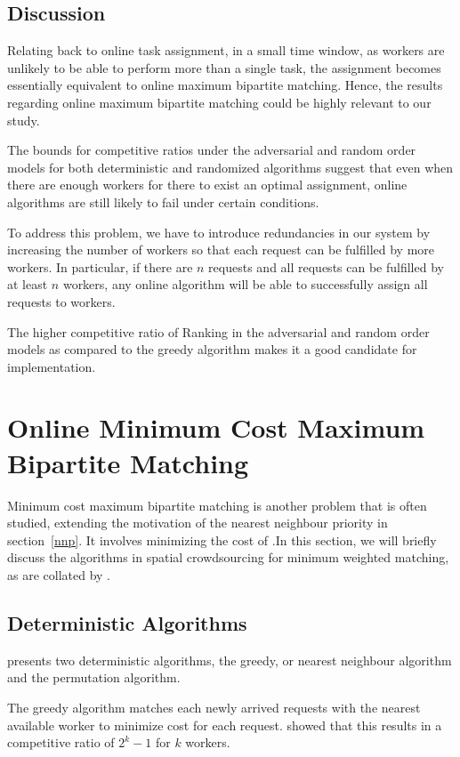 \documentclass[urop]{socreport}
\begin{document}
\subsection{Discussion}
Relating back to online task assignment, in a small time window, as workers are unlikely to be able to perform more than a single task, the assignment becomes essentially equivalent to online maximum bipartite matching. Hence, the results regarding online maximum bipartite matching could be highly relevant to our study.  

The bounds for competitive ratios under the adversarial and random order models for both deterministic and randomized algorithms suggest that even when there are enough workers for there to exist an optimal assignment, online algorithms are still likely to fail under certain conditions. 

To address this problem, we have to introduce redundancies in our system by increasing the number of workers so that each request can be fulfilled by more workers. In particular, if there are $n$ requests and all requests can be fulfilled by at least $n$ workers, any online algorithm will be able to successfully assign all requests to workers. 

The higher competitive ratio of Ranking in the adversarial and random order models as compared to the greedy algorithm makes it a good candidate for implementation.


\section{Online Minimum Cost Maximum Bipartite Matching}
Minimum cost maximum bipartite matching is another problem that is often studied, extending the motivation of the nearest neighbour priority in section~\ref{nnp}. It involves minimizing the cost of .In this section, we will briefly discuss the algorithms in spatial crowdsourcing for minimum weighted matching, as are collated by \cite{tong}.
\subsection{Deterministic Algorithms}
\cite{greedy} presents two deterministic algorithms, the greedy, or nearest neighbour algorithm and the permutation algorithm.

The greedy algorithm matches each newly arrived requests with the nearest available worker to minimize cost for each request. \cite{greedy} showed that this results in a competitive ratio of $2^k - 1$ for $k$ workers.
\end{document}
